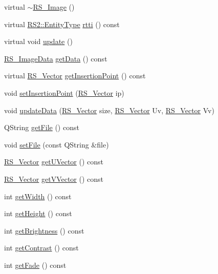 \begin{DoxyCompactItemize}
\item 
virtual \hyperlink{classRS__Image_a255181d896bed9810f1b1e0c92ff1bed}{$\sim$\-R\-S\-\_\-\-Image} ()
\item 
virtual \hyperlink{classRS2_a8f26d1b981e1e85cff16738b43337e6a}{R\-S2\-::\-Entity\-Type} \hyperlink{classRS__Image_a20dd71d4c379a4dad8ccc5b0a165a8f3}{rtti} () const 
\item 
virtual void \hyperlink{classRS__Image_ae74bdab80ffedf5728a690039c1e0b07}{update} ()
\item 
\hyperlink{classRS__ImageData}{R\-S\-\_\-\-Image\-Data} \hyperlink{classRS__Image_a236d0e5fc0fc6c7334f05323f1fcd9b0}{get\-Data} () const 
\item 
virtual \hyperlink{classRS__Vector}{R\-S\-\_\-\-Vector} \hyperlink{classRS__Image_aa64f8a8589d9ce313fc37488185ff96d}{get\-Insertion\-Point} () const 
\item 
void \hyperlink{classRS__Image_af7473d01b050fd477ec4db373683564e}{set\-Insertion\-Point} (\hyperlink{classRS__Vector}{R\-S\-\_\-\-Vector} ip)
\item 
void \hyperlink{classRS__Image_aa6c0ba16d2932e84daa36b0a1ec525a6}{update\-Data} (\hyperlink{classRS__Vector}{R\-S\-\_\-\-Vector} size, \hyperlink{classRS__Vector}{R\-S\-\_\-\-Vector} Uv, \hyperlink{classRS__Vector}{R\-S\-\_\-\-Vector} Vv)
\item 
Q\-String \hyperlink{classRS__Image_a16f95af8cb6952eea68a25cb20e80fe6}{get\-File} () const 
\item 
void \hyperlink{classRS__Image_abe865d0b9ea018c81de65b22a2426781}{set\-File} (const Q\-String \&file)
\item 
\hyperlink{classRS__Vector}{R\-S\-\_\-\-Vector} \hyperlink{classRS__Image_a144657b62b34f889c3796585d0e8a78b}{get\-U\-Vector} () const 
\item 
\hyperlink{classRS__Vector}{R\-S\-\_\-\-Vector} \hyperlink{classRS__Image_aa4073d22146184642e3b6adbd9eb9af0}{get\-V\-Vector} () const 
\item 
int \hyperlink{classRS__Image_ad7b8312d3c4825469b0165502a6dfef7}{get\-Width} () const 
\item 
int \hyperlink{classRS__Image_a99ea40cd29865e44eaad43075e0c02cd}{get\-Height} () const 
\item 
int \hyperlink{classRS__Image_aa9cc9a08d9dd45ccc76e70ee77d88a9d}{get\-Brightness} () const 
\item 
int \hyperlink{classRS__Image_a528cf910764f2994939260d2238b8e14}{get\-Contrast} () const 
\item 
int \hyperlink{classRS__Image_a1f99554b36f597ce8cb69be047277aab}{get\-Fade} () const 

\end{DoxyCompactItemize}
